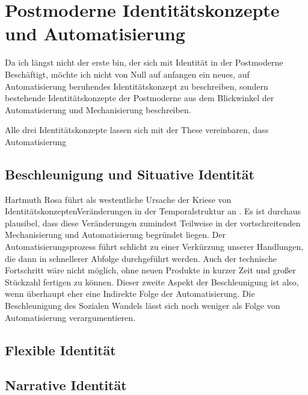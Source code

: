 \section{Postmoderne Identitätskonzepte und Automatisierung}

Da ich längst nicht der erste bin, der sich mit Identität in der Postmoderne Beschäftigt, möchte ich nicht von Null auf anfangen ein neues, auf Automatisierung beruhendes Identitätskonzept zu beschreiben, sondern bestehende Identitätskonzepte der Postmoderne aus dem Blickwinkel der Automatisierung und Mechanisierung beschreiben.

Alle drei Identitätskonzepte lassen sich mit der These vereinbaren, dass Automatisierung 

\subsection{Beschleunigung und Situative Identität}

Hartmuth Rosa führt als westentliche Ursache der Kriese von IdentitätskonzeptenVeränderungen in der Temporalstruktur an \parencite{rosa}.
Es ist durchaus plausibel, dass diese Veränderungen zumindest Teilweise in der vortschreitenden Mechanisierung und Automatisierung begründet liegen.
Der Automatisierungsprozess führt schlicht zu einer Verkürzung unserer Handlungen, die dann in schnellerer Abfolge durchgeführt werden.
Auch der technische Fortschritt wäre nicht möglich, ohne neuen Produkte in kurzer Zeit und großer Stückzahl fertigen zu können.
Dieser zweite Aspekt der Beschleunigung ist also, wenn überhaupt eher eine Indirekte Folge der Automatisierung.
Die Beschleunigung des Sozialen Wandels lässt sich noch weniger als Folge von Automatisierung verargumentieren.

\subsection{Flexible Identität}

\subsection{Narrative Identität}

